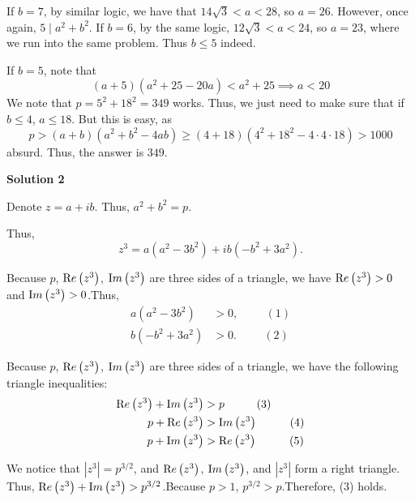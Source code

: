 \begin{enumerate}
{{ If $b=7$, by similar logic, we have that $14\sqrt 3 <a< 28$, so $a=26$. However, once again, $5\mid a^2+b^2$. If $b=6$, by the same logic, $12\sqrt3<a<24$, so $a=23$, where we run into the same problem. Thus $b\leq 5$ indeed.

 If $b=5$, note that
 \[(a+5)(a^2+25-20a)<a^2+25\implies a<20\]We note that $p=5^2+18^2=349$ works. Thus, we just need to make sure that if $b\leq 4$, $a\leq 18$. But this is easy, as
 \[p>(a+b)(a^2+b^2-4ab)\geq (4+18)(4^2+18^2-4\cdot 4\cdot 18)>1000\]absurd. Thus, the answer is $\boxed{349}$.

 



\textbf{Solution 2}

Denote $z = a + i b$. Thus, $a^2 + b^2 = p$.

 Thus,
 \[z^3 = a \left( a^2 - 3 b^2 \right) + i b \left( - b^2 + 3 a^2 \right) .\]

 Because $p$, ${\textrm Re} \left( z^3 \right)$, ${\textrm Im} \left( z^3 \right)$ are three sides of a triangle, we have ${\textrm Re} \left( z^3 \right) > 0$ and ${\textrm Im} \left( z^3 \right) > 0$.Thus,
 \begin{align*} a \left( a^2 - 3 b^2 \right) & > 0 , \hspace{1cm} (1) \\ b \left( - b^2 + 3 a^2 \right) & > 0. \hspace{1cm} (2) \end{align*}


 Because $p$, ${\textrm Re} \left( z^3 \right)$, ${\textrm Im} \left( z^3 \right)$ are three sides of a triangle, we have the following triangle inequalities:
 \begin{align*} {\textrm Re} \left( z^3 \right) + {\textrm Im} \left( z^3 \right) & > p \hspace{1cm} (3) \\ p + {\textrm Re} \left( z^3 \right) & > {\textrm Im} \left( z^3 \right) \hspace{1cm} (4) \\ p + {\textrm Im} \left( z^3 \right) & > {\textrm Re} \left( z^3 \right) \hspace{1cm} (5) \end{align*}


 We notice that $| z^3 | = p^{3/2}$, and ${\textrm Re} \left( z^3 \right)$, ${\textrm Im} \left( z^3 \right)$, and $| z^3 |$ form a right triangle. Thus, ${\textrm Re} \left( z^3 \right) + {\textrm Im} \left( z^3 \right) > p^{3/2}$.Because $p > 1$, $p^{3/2} > p$.Therefore, (3) holds.

}}
\end{enumerate}
